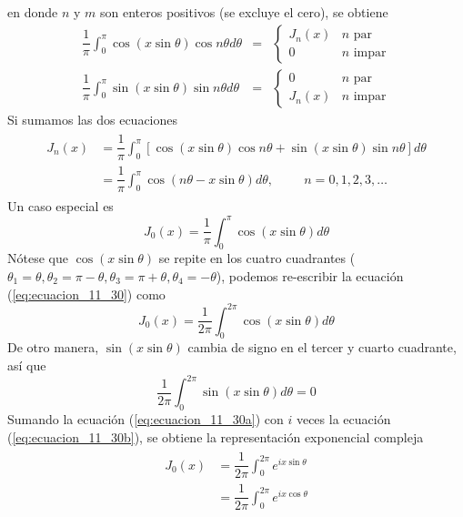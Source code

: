 en donde $n$ y $m$ son enteros positivos (se excluye el cero), se obtiene
\begin{eqnarray}
\dfrac{1}{\pi} \int_{0}^{\pi} \cos (x \sin \theta) \cos n \theta d \theta &=& \begin{cases}
J_{n}(x) & n \text{ par} \\
0 & n \text{ impar} \end{cases} \label{eq:ecuacion_11_27} \\
\dfrac{1}{\pi} \int_{0}^{\pi} \sin (x \sin \theta) \sin n \theta d \theta &=& \begin{cases}
0 & n \text{ par} \\
J_{n}(x) & n \text{ impar} \end{cases}  \label{eq:ecuacion_11_28}
\end{eqnarray}
Si sumamos las dos ecuaciones
\begin{eqnarray}
\begin{aligned}
J_{n}(x) &= \dfrac{1}{\pi} \int_{0}^{\pi} [ \cos (x \sin \theta) \cos n \theta + \sin (x \sin \theta) \sin n \theta] d\theta \\
&= \dfrac{1}{\pi} \int_{0}^{\pi} \cos (n \theta - x \sin \theta) d \theta, \hspace{1cm} n=0,1,2,3,\ldots
\end{aligned}
\label{eq:ecuacion_11_29}
\end{eqnarray}
Un caso especial es
\begin{equation}
J_{0} (x) = \dfrac{1}{\pi} \int_{0}^{\pi} \cos (x \sin \theta) d \theta
\label{eq:ecuacion_11_30}
\end{equation}
Nótese que $\cos( x \sin \theta)$ se repite en los cuatro cuadrantes ($\theta_{1} = \theta, \theta_{2} = \pi - \theta, \theta_{3} = \pi + \theta, \theta_{4} = - \theta$), podemos re-escribir la ecuación (\ref{eq:ecuacion_11_30}) como
\begin{equation}
J_{0}(x) = \dfrac{1}{2 \pi} \int_{0}^{2 \pi} \cos (x \sin \theta) d \theta
\label{eq:ecuacion_11_30a}
\end{equation}
De otro manera, $\sin(x \sin \theta)$ cambia de signo en el tercer y cuarto cuadrante, así que
\begin{equation}
\dfrac{1}{2 \pi} \int_{0}^{2 \pi} \sin (x \sin \theta) d \theta = 0
\label{eq:ecuacion_11_30b}
\end{equation}
Sumando la ecuación (\ref{eq:ecuacion_11_30a}) con $i$ veces la ecuación (\ref{eq:ecuacion_11_30b}), se obtiene la representación exponencial compleja
\begin{eqnarray}
\begin{aligned}
J_{0}(x) &= \dfrac{1}{2 \pi} \int_{0}^{2 \pi} e^{ix \sin \theta} \\
&= \dfrac{1}{2 \pi} \int_{0}^{2 \pi} e^{ix \cos \theta}
\end{aligned}
\label{eq:ecuacion_11_30c}
\end{eqnarray}
\newpage
